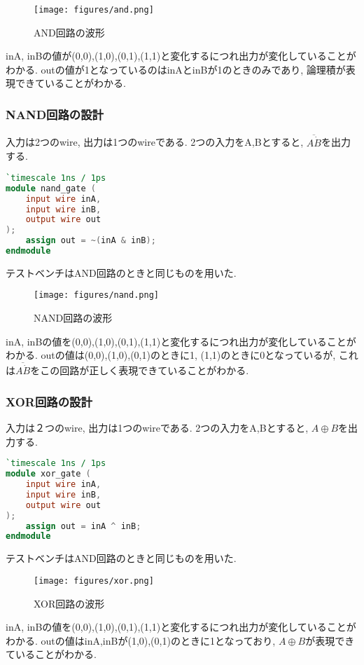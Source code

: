 \documentclass[titlepage]{ltjsarticle}
\begin{document}
\begin{figure}[H]
    \begin{center}
        \texttt{[image: figures/and.png]}
        \caption{AND回路の波形}
    \end{center}
\end{figure}
inA, inBの値が(0,0),(1,0),(0,1),(1,1)と変化するにつれ出力が変化していることがわかる. outの値が1となっているのはinAとinBが1のときのみであり, 論理積が表現できていることがわかる. 

\subsubsection{NAND回路の設計}
入力は2つのwire, 出力は1つのwireである. 2つの入力をA,Bとすると, $\overline{A\dot B}$を出力する. 

\begin{lstlisting}[caption=NANDデザイン,language=verilog]
`timescale 1ns / 1ps
module nand_gate (
    input wire inA,
    input wire inB,
    output wire out
);
    assign out = ~(inA & inB);
endmodule
\end{lstlisting}
テストベンチはAND回路のときと同じものを用いた. 

\begin{figure}[H]
    \begin{center}
        \texttt{[image: figures/nand.png]}
        \caption{NAND回路の波形}
    \end{center}
\end{figure}
inA, inBの値を(0,0),(1,0),(0,1),(1,1)と変化するにつれ出力が変化していることがわかる. outの値は(0,0),(1,0),(0,1)のときに1, (1,1)のときに0となっているが, これは$\overline{A\dot B}$をこの回路が正しく表現できていることがわかる. 

\subsubsection{XOR回路の設計}
入力は２つのwire, 出力は1つのwireである. 2つの入力をA,Bとすると, $A \oplus B$を出力する. 
\begin{lstlisting}[caption=XORデザイン, language=verilog]
`timescale 1ns / 1ps
module xor_gate (
    input wire inA,
    input wire inB,
    output wire out
);
    assign out = inA ^ inB;
endmodule
\end{lstlisting}
テストベンチはAND回路のときと同じものを用いた. 
\begin{figure}[H]
    \begin{center}
        \texttt{[image: figures/xor.png]}
        \caption{XOR回路の波形}
    \end{center}
\end{figure}
inA, inBの値を(0,0),(1,0),(0,1),(1,1)と変化するにつれ出力が変化していることがわかる. outの値はinA,inBが(1,0),(0,1)のときに1となっており, $A \oplus B$が表現できていることがわかる. 
\end{document}
